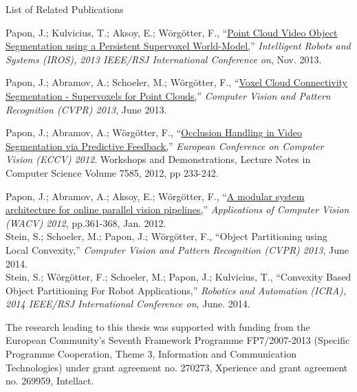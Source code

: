 
\noindent
\begin{flushright}
\huge List of Related Publications
\end{flushright} 
\vspace{50pt} 


\hangindent=1.5cm Papon, J.;  Kulvicius, T.; Aksoy, E.; Wörgötter, F., ``\href{http://www.dpi.physik.uni-goettingen.de/cns/uploads_bibtexmodule/PDF/paponkulviciusaksoy2013.pdf}{Point Cloud Video Object Segmentation using a Persistent Supervoxel World-Model,}'' \emph{Intelligent Robots and Systems (IROS), 2013 IEEE/RSJ International Conference on}, Nov. 2013. \\
\vspace{12pt}

\hangindent=1.5cm Papon, J.;  Abramov, A.; Schoeler, M.; Wörgötter, F., ``\href{http://www.cv-foundation.org/openaccess/content_cvpr_2013/papers/Papon_Voxel_Cloud_Connectivity_2013_CVPR_paper.pdf}{Voxel Cloud Connectivity Segmentation - Supervoxels for Point Clouds,}'' \emph{Computer Vision and Pattern Recognition (CVPR) 2013}, June 2013. \\
\vspace{12pt}

\hangindent=1.5cm Papon, J.;  Abramov, A.; Wörgötter, F., ``\href{http://dx.doi.org/10.1007/978-3-642-33885-4_24}{Occlusion Handling in Video Segmentation via Predictive Feedback,}'' \emph{European Conference on Computer Vision (ECCV) 2012}. Workshops and Demonstrations, Lecture Notes in Computer Science Volume 7585, 2012, pp 233-242. \\
\vspace{12pt}

\hangindent=1.5cm Papon, J.;  Abramov, A.; Aksoy, E.; Wörgötter, F., ``\href{http://dx.doi.org/10.1109/WACV.2012.6163002}{A modular system architecture for online parallel vision pipelines,}'' \emph{Applications of Computer Vision (WACV) 2012}, pp.361-368, Jan. 2012. \\

\hangindent=1.5cm Stein, S.; Schoeler, M.; Papon, J.;  Wörgötter, F., ``{Object Partitioning using Local Convexity,}'' \emph{Computer Vision and Pattern Recognition (CVPR) 2013}, June 2014. \\

\hangindent=1.5cm Stein, S.;  Wörgötter, F.; Schoeler, M.; Papon, J.; Kulvicius, T., ``{Convexity Based Object Partitioning For Robot Applications,}'' \emph{Robotics and Automation (ICRA), 2014 IEEE/RSJ International Conference on}, June. 2014. \\

\vspace{100pt}

The research leading to this thesis was supported with funding from the European Community's Seventh Framework Programme FP7/2007-2013 (Specific Programme Cooperation, Theme 3, Information and Communication Technologies) under grant agreement no. 270273, Xperience and grant agreement no. 269959, Intellact.

 
